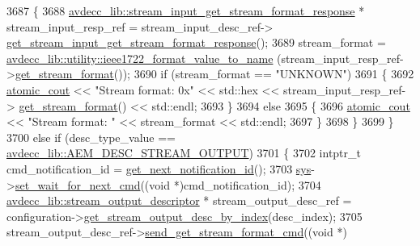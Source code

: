 \begin{DoxyCode}
3687         \{
3688             \hyperlink{classavdecc__lib_1_1stream__input__get__stream__format__response}{avdecc\_lib::stream\_input\_get\_stream\_format\_response}
       * stream\_input\_resp\_ref = stream\_input\_desc\_ref->
      \hyperlink{classavdecc__lib_1_1stream__input__descriptor_a5936825ba5c5fb6181218bec80cafce5}{get\_stream\_input\_get\_stream\_format\_response}();
3689             stream\_format = \hyperlink{namespaceavdecc__lib_1_1utility_a65f055a50d3d236b67d30c1a7b8425c8}{avdecc\_lib::utility::ieee1722\_format\_value\_to\_name}
      (stream\_input\_resp\_ref->\hyperlink{classavdecc__lib_1_1stream__input__get__stream__format__response_aba7b3a3a06d9c53ef54e43787fa46a7a}{get\_stream\_format}());
3690             \textcolor{keywordflow}{if} (stream\_format == \textcolor{stringliteral}{"UNKNOWN"})
3691             \{
3692                 \hyperlink{cmd__line_8h_a0bc38ccc65c79ba06c6fcd7b4bf554c3}{atomic\_cout} << \textcolor{stringliteral}{"Stream format: 0x"} << std::hex << stream\_input\_resp\_ref->
      \hyperlink{classavdecc__lib_1_1stream__input__get__stream__format__response_aba7b3a3a06d9c53ef54e43787fa46a7a}{get\_stream\_format}() << std::endl;
3693             \}
3694             \textcolor{keywordflow}{else}
3695             \{
3696                 \hyperlink{cmd__line_8h_a0bc38ccc65c79ba06c6fcd7b4bf554c3}{atomic\_cout} << \textcolor{stringliteral}{"Stream format: "} << stream\_format << std::endl;
3697             \}
3698         \}
3699     \}
3700     \textcolor{keywordflow}{else} \textcolor{keywordflow}{if} (desc\_type\_value == \hyperlink{namespaceavdecc__lib_ac7b7d227e46bc72b63ee9e9aae15902fa3e5e9421e49598854000feaa2fe71464}{avdecc\_lib::AEM\_DESC\_STREAM\_OUTPUT})
3701     \{
3702         intptr\_t cmd\_notification\_id = \hyperlink{classcmd__line_a57486218387d1aa9d262eb7c176154ad}{get\_next\_notification\_id}();
3703         \hyperlink{classcmd__line_a485db4800e331cb4052c447fdf5d154e}{sys}->\hyperlink{classavdecc__lib_1_1system_a26b769584f10225077da47583edda33e}{set\_wait\_for\_next\_cmd}((\textcolor{keywordtype}{void} *)cmd\_notification\_id);
3704         \hyperlink{classavdecc__lib_1_1stream__output__descriptor}{avdecc\_lib::stream\_output\_descriptor} * stream\_output\_desc\_ref =
       configuration->\hyperlink{classavdecc__lib_1_1configuration__descriptor_a300ea5957342e2e9579318135da02856}{get\_stream\_output\_desc\_by\_index}(desc\_index);
3705         stream\_output\_desc\_ref->\hyperlink{classavdecc__lib_1_1stream__output__descriptor_a4ba58b32ff7b9f5d961a0a5eb46d4c6c}{send\_get\_stream\_format\_cmd}((\textcolor{keywordtype}{void} *)

\end{DoxyCode}
